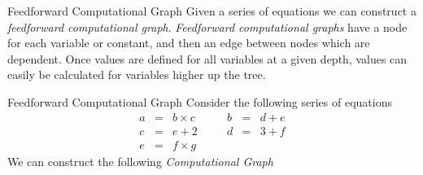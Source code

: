 \documentclass[11pt,a4paper]{article}
\begin{document}
  \begin{definition}{Feedforward Computational Graph}
    Given a series of equations we can construct a \textit{feedforward computational graph}. \textit{Feedforward computational graphs} have a node for each variable or constant, and then an edge between nodes which are dependent. Once values are defined for all variables at a given depth, values can easily be calculated for variables higher up the tree.
  \end{definition}

  \begin{example}{Feedforward Computational Graph}
    Consider the following series of equations
    \[\begin{array}{rclcrcl}
      a&=&b\times c&\quad&b&=&d+e\\
      c&=&e+2&&d&=&3+f\\
      e&=&f\times g
    \end{array}\]
    We can construct the following \textit{Computational Graph}
    \begin{center}\end{center}
  \end{example}
\end{document}
